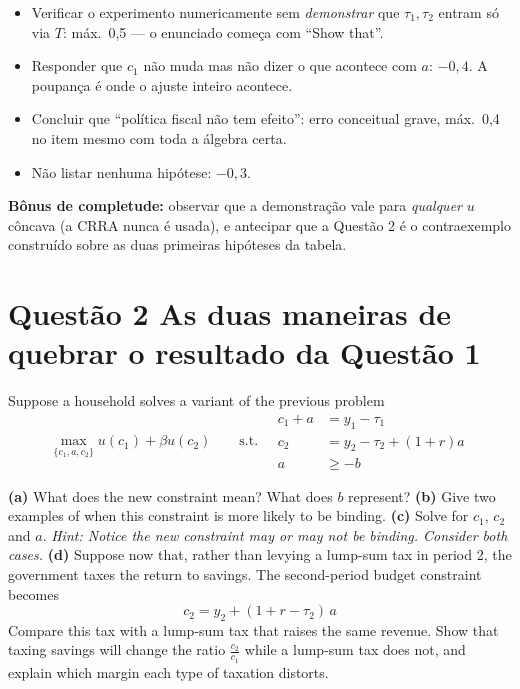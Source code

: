 \documentclass[11pt, a4paper]{article}
\begin{document}
\begin{tcolorbox}[rubricbox]
\small
\begin{itemize}[topsep=2pt]
\item Verificar o experimento numericamente sem \emph{demonstrar} que $\tau_1,\tau_2$
      entram só via $T$: máx.\ 0,5 --- o enunciado começa com ``Show that''.
\item Responder que $c_1$ não muda mas não dizer o que acontece com $a$: $-0{,}4$. A
      poupança é onde o ajuste inteiro acontece.
\item Concluir que ``política fiscal não tem efeito'': erro conceitual grave, máx.\ 0,4 no
      item mesmo com toda a álgebra certa.
\item Não listar nenhuma hipótese: $-0{,}3$.
\end{itemize}
\textbf{Bônus de completude:} observar que a demonstração vale para \emph{qualquer} $u$
côncava (a CRRA nunca é usada), e antecipar que a Questão 2 é o contraexemplo construído
sobre as duas primeiras hipóteses da tabela.
\end{tcolorbox}

\section[Questão 2 --- As duas maneiras de quebrar Ricardo]{Questão 2 \quad As duas maneiras de quebrar o resultado da Questão 1}

\begin{tcolorbox}[questionbox]
\small
Suppose a household solves a variant of the previous problem
$$\max_{\{c_1,a,c_2\}} u(c_1)+\beta u(c_2)
\qquad \text{s.t.} \quad
\begin{aligned}
c_1 + a &= y_1 - \tau_1 \\
c_2 &= y_2 - \tau_2 + (1+r)a \\
a &\ge -b
\end{aligned}$$

\smallskip
\textbf{(a)} What does the new constraint mean? What does $b$ represent?
\textbf{(b)} Give two examples of when this constraint is more likely to be binding.
\textbf{(c)} Solve for $c_1$, $c_2$ and $a$. \emph{Hint: Notice the new constraint may or
may not be binding. Consider both cases.}
\textbf{(d)} Suppose now that, rather than levying a lump-sum tax in period 2, the
government taxes the return to savings. The second-period budget constraint becomes
$$c_2 = y_2 + (1+r-\tau_2)\,a$$
Compare this tax with a lump-sum tax that raises the same revenue. Show that taxing savings
will change the ratio $\frac{c_2}{c_1}$ while a lump-sum tax does not, and explain which
margin each type of taxation distorts.
\end{tcolorbox}
\end{document}
